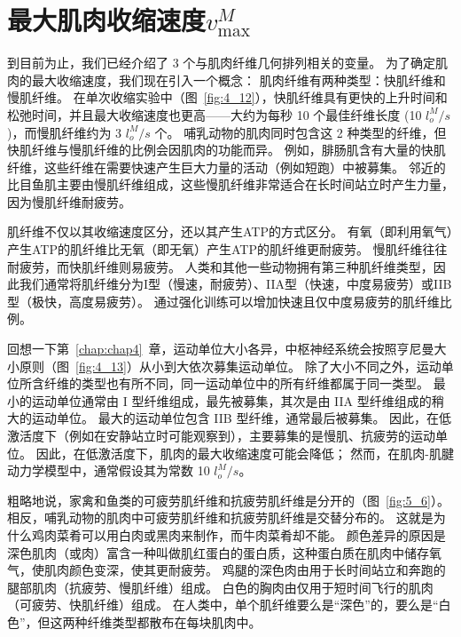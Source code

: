 \section{最大肌肉收缩速度$v_\text{max}^M$}

到目前为止，我们已经介绍了 3 个与肌肉纤维几何排列相关的变量。
为了确定肌肉的最大收缩速度，我们现在引入一个概念：
肌肉纤维有两种类型：快肌纤维和慢肌纤维。
在单次收缩实验中（图~\ref{fig:4_12}），快肌纤维具有更快的上升时间和松弛时间，并且最大收缩速度也更高——大约为每秒 10 个最佳纤维长度 (10 $l_o^M / s$)，而慢肌纤维约为 3 $l_o^M / s$ 个。
哺乳动物的肌肉同时包含这 2 种类型的纤维，但快肌纤维与慢肌纤维的比例会因肌肉的功能而异。
例如，腓肠肌含有大量的快肌纤维，这些纤维在需要快速产生巨大力量的活动（例如短跑）中被募集。
邻近的比目鱼肌主要由慢肌纤维组成，这些慢肌纤维非常适合在长时间站立时产生力量，因为慢肌纤维耐疲劳。


肌纤维不仅以其收缩速度区分，还以其产生ATP的方式区分。
有氧（即利用氧气）产生ATP的肌纤维比无氧（即无氧）产生ATP的肌纤维更耐疲劳。
慢肌纤维往往耐疲劳，而快肌纤维则易疲劳。
人类和其他一些动物拥有第三种肌纤维类型，因此我们通常将肌纤维分为I型（慢速，耐疲劳）、IIA型（快速，中度易疲劳）或IIB型（极快，高度易疲劳）。
通过强化训练可以增加快速且仅中度易疲劳的肌纤维比例。


回想一下第~\ref{chap:chap4}~章，运动单位大小各异，中枢神经系统会按照亨尼曼大小原则（图~\ref{fig:4_13}）从小到大依次募集运动单位。
除了大小不同之外，运动单位所含纤维的类型也有所不同，同一运动单位中的所有纤维都属于同一类型。
最小的运动单位通常由 I 型纤维组成，最先被募集，其次是由 IIA 型纤维组成的稍大的运动单位。
最大的运动单位包含 IIB 型纤维，通常最后被募集。
因此，在低激活度下（例如在安静站立时可能观察到），主要募集的是慢肌、抗疲劳的运动单位。
因此，在低激活度下，肌肉的最大收缩速度可能会降低；
然而，在肌肉-肌腱动力学模型中，通常假设其为常数 10 $l_o^M/s$。


粗略地说，家禽和鱼类的可疲劳肌纤维和抗疲劳肌纤维是分开的（图~\ref{fig:5_6}）。
相反，哺乳动物的肌肉中可疲劳肌纤维和抗疲劳肌纤维是交替分布的。
这就是为什么鸡肉菜肴可以用白肉或黑肉来制作，而牛肉菜肴却不能。
颜色差异的原因是深色肌肉（或肉）富含一种叫做肌红蛋白的蛋白质，这种蛋白质在肌肉中储存氧气，使肌肉颜色变深，使其更耐疲劳。
鸡腿的深色肉由用于长时间站立和奔跑的腿部肌肉（抗疲劳、慢肌纤维）组成。
白色的胸肉由仅用于短时间飞行的肌肉（可疲劳、快肌纤维）组成。
在人类中，单个肌纤维要么是“深色”的，要么是“白色”，但这两种纤维类型都散布在每块肌肉中。


